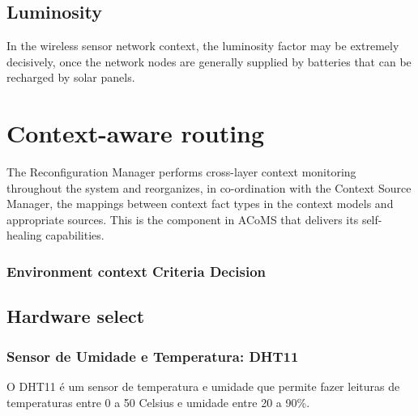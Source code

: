 \subsection{Luminosity}
In the wireless sensor network context, the luminosity factor may be extremely decisively, once the network nodes are generally supplied by batteries that can be recharged by solar panels.

\section{Context-aware routing}
The Reconfiguration Manager performs cross-layer context monitoring throughout the system and reorganizes, in co-ordination with the Context Source Manager, the mappings between context fact types in the context models and appropriate sources. This is the component in ACoMS that delivers its self-healing capabilities.



\subsubsection{Environment context Criteria Decision}



\subsection{Hardware select} %
\label{sub:hardware_select}


\subsubsection{Sensor de Umidade e Temperatura: DHT11}

O DHT11 é um sensor de temperatura e umidade que permite fazer leituras de temperaturas entre 0 a 50 Celsius e umidade entre 20 a 90\%.

